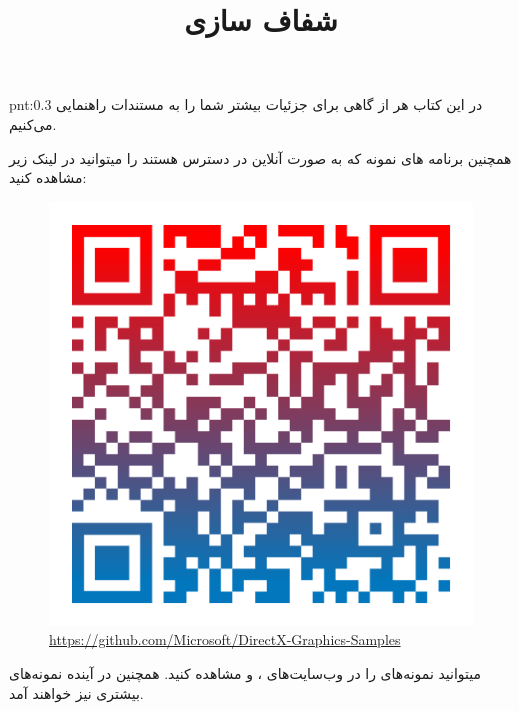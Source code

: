 {\begin{spacing}{1.5}
        \begin{point}{pnt:0.3}
            در این کتاب هر از گاهی برای جزئیات بیشتر شما را به مستندات راهنمایی می‌کنیم.
        \end{point}
        همچنین برنامه های نمونه  که به صورت آنلاین در دسترس هستند را میتوانید در لینک زیر مشاهده کنید:

        \begin{figure}[H]
            \centering
            \setlength{\belowcaptionskip}{-10pt}
            \includegraphics[scale=0.15]{Images/3/3.Intro.1.3}
            \caption*{\Large \url{https://github.com/Microsoft/DirectX-Graphics-Samples}}
        \end{figure}

        میتوانید نمونه‌های  را در وب‌سایت‌های ،  و  مشاهده کنید. همچنین در آینده نمونه‌های بیشتری نیز خواهند آمد.
    \end{spacing}
}
\textbf{\vspace{10pt}}

\title{
    \huge
    \hspace{-40pt}
    \textbf{شفاف سازی}
}  \rullFillWithLine[0.5em]{1pt}
\textbf{\vspace{7pt}}

